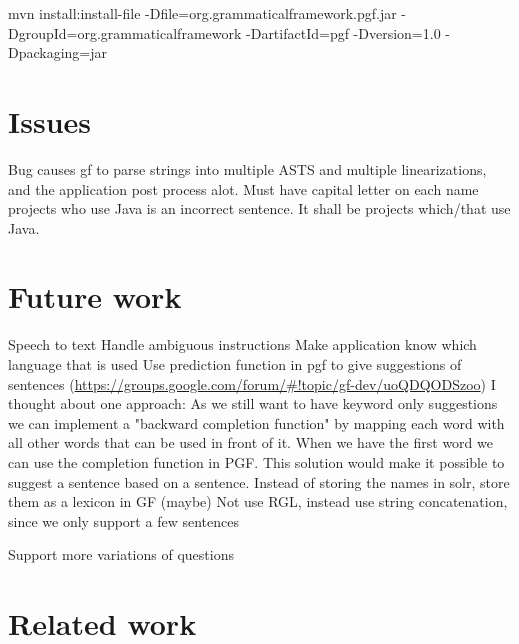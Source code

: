 mvn install:install-file -Dfile=org.grammaticalframework.pgf.jar -DgroupId=org.grammaticalframework -DartifactId=pgf -Dversion=1.0 -Dpackaging=jar

\section{Issues}
Bug causes gf to parse strings into multiple ASTS and multiple linearizations, and the application post process alot.
Must have capital letter on each name
projects who use Java is an incorrect sentence. It shall be projects which/that use Java.

\section{Future work}
Speech to text
Handle ambiguous instructions
Make application know which language that is used
Use prediction function in pgf to give suggestions of sentences (\url{https://groups.google.com/forum/#!topic/gf-dev/uoQDQODSzoo})
    I thought about one approach: As we still want to have keyword only suggestions we can implement a "backward completion function" by mapping each word with all other words that can be used in front of it.
    When we have the first word we can use the completion function in PGF. This solution would make it possible to suggest a sentence based on a sentence.
Instead of storing the names in solr, store them as a lexicon in GF (maybe)
Not use RGL, instead use string concatenation, since we only support a few sentences

Support more variations of questions 

\section{Related work}
